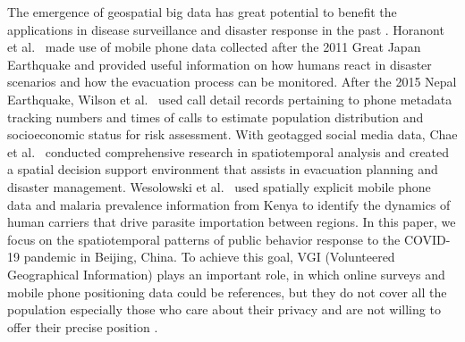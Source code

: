 \documentclass[ijgi,submit,moreauthors,pdftex]{Definitions/mdpi}
\begin{document}
The emergence of geospatial big data has great potential to benefit the applications in disease surveillance and disaster response in the past \cite{Yu2018Big, Goodchild2010Crowdsourcing, Huang2015Predicating}.
Horanont et al.\ \cite{Horanont2013Auto} made use of mobile phone data collected after the 2011 Great Japan Earthquake and provided useful information on how humans react in disaster scenarios and how the evacuation process can be monitored.
After the 2015 Nepal Earthquake, Wilson et al.\ \cite{Wilson2016Rapid} used call detail records pertaining to phone metadata tracking numbers and times of calls to estimate population distribution and socioeconomic status for risk assessment.
With geotagged social media data, Chae et al.\ \cite{CHAE2013Public} conducted comprehensive research in spatiotemporal analysis and created a spatial decision support environment that assists in evacuation planning and disaster management.
Wesolowski et al.\ \cite{Wesolowski2012Quantifying} used spatially explicit mobile phone data and malaria prevalence information from Kenya to identify the dynamics of human carriers that drive parasite importation between regions. 
In this paper, we focus on the spatiotemporal patterns of public behavior response to the COVID-19 pandemic in Beijing, China.
To achieve this goal, VGI (Volunteered Geographical Information) plays an important role, in which online surveys and mobile phone positioning data could be references, but they do not cover all the population especially those who care about their privacy and are not willing to offer their precise position \cite{Li2016ISPRS}. 
\end{document}
